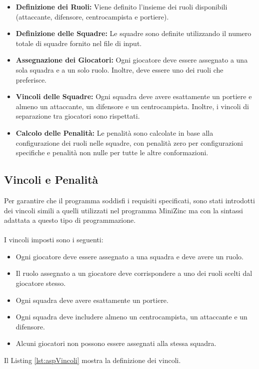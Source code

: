 \documentclass{article}
\begin{document}
\begin{multicols*}{2}
\begin{itemize}
    \item \textbf{Definizione dei Ruoli:} Viene definito l'insieme dei ruoli disponibili (attaccante, difensore, centrocampista e portiere).
    \item \textbf{Definizione delle Squadre:} Le squadre sono definite utilizzando il numero totale di squadre fornito nel file di input.
    \item \textbf{Assegnazione dei Giocatori:} Ogni giocatore deve essere assegnato a una sola squadra e a un solo ruolo. Inoltre, deve essere uno dei ruoli che preferisce.
    \item \textbf{Vincoli delle Squadre:} Ogni squadra deve avere esattamente un portiere e almeno un attaccante, un difensore e un centrocampista. Inoltre, i vincoli di separazione tra giocatori sono rispettati.
    \item \textbf{Calcolo delle Penalità:} Le penalità sono calcolate in base alla configurazione dei ruoli nelle squadre, con penalità zero per configurazioni specifiche e penalità non nulle per tutte le altre conformazioni.
\end{itemize}

\subsection{Vincoli e Penalità}
Per garantire che il programma soddisfi i requisiti specificati, 
sono stati introdotti dei vincoli simili a quelli utilizzati nel programma MiniZinc ma con la sintassi adattata a questo tipo di programmazione. 
\\
\\
I vincoli imposti sono i seguenti:

\begin{itemize}
    \item Ogni giocatore deve essere assegnato a una squadra e deve avere un ruolo.
    \item Il ruolo assegnato a un giocatore deve corrispondere a uno dei ruoli scelti dal giocatore stesso.
    \item Ogni squadra deve avere esattamente un portiere.
    \item Ogni squadra deve includere almeno un centrocampista, un attaccante e un difensore.
    \item Alcuni giocatori non possono essere assegnati alla stessa squadra.
\end{itemize}
Il Listing \ref{lst:aspVincoli} mostra la definizione dei vincoli.


\end{multicols*}
\end{document}
